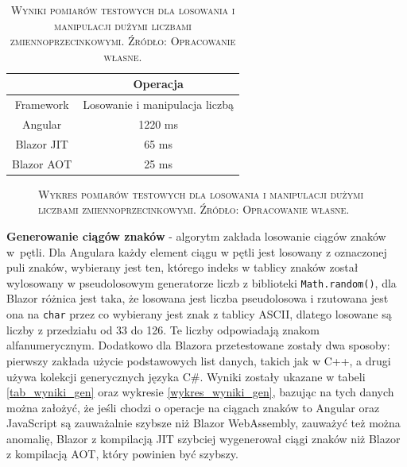 \documentclass[12pt,a4paper,oneside]{book}
\newcommand{\captionT}[1]{\caption{\textsc{\footnotesize{#1}}}}
\begin{document}
\begin{table}[!htp]
\centering
\begin{tabular}{ |c|c| }
 \hline
  & Operacja \\
 \hline
  Framework & Losowanie i manipulacja liczbą\\
 \hline
Angular & 1220 ms\\
Blazor JIT & 65 ms\\
Blazor AOT & 25 ms\\

 \hline
\end{tabular}
\captionT{Wyniki pomiarów testowych dla losowania i manipulacji dużymi liczbami zmiennoprzecinkowymi. Źródło: Opracowanie własne.}
\label{tab_wyniki_losowe_decimal}
\end{table}

\begin{figure}[!htp]
\centering
{}
\captionT{Wykres pomiarów testowych dla losowania i manipulacji dużymi liczbami zmiennoprzecinkowymi. Źródło: Opracowanie własne.}
\label{wykres_wyniki_losowe_decimal}
\end{figure}

\textbf{Generowanie ciągów znaków} - algorytm zakłada losowanie ciągów znaków w~pętli. Dla Angulara każdy element ciągu w pętli jest losowany z oznaczonej puli znaków, wybierany jest ten, którego indeks w tablicy znaków został wylosowany w pseudolosowym generatorze liczb z biblioteki \texttt{Math.random()}, dla Blazor różnica jest taka, że losowana jest liczba pseudolosowa i rzutowana jest ona na \texttt{char} przez co wybierany jest znak z tablicy ASCII, dlatego losowane są liczby z przedziału od 33 do 126. Te liczby odpowiadają znakom alfanumerycznym. Dodatkowo dla Blazora przetestowane zostały dwa sposoby: pierwszy zakłada użycie podstawowych list danych, takich jak w C++, a drugi używa kolekcji generycznych języka C\#. Wyniki zostały ukazane w tabeli \ref{tab_wyniki_gen} oraz wykresie \ref{wykres_wyniki_gen}, bazując na tych danych można założyć, że jeśli chodzi o operacje na ciągach znaków to Angular oraz JavaScript są zauważalnie szybsze niż Blazor WebAssembly, zauważyć też można anomalię, Blazor z kompilacją JIT szybciej wygenerował ciągi znaków niż Blazor z kompilacją AOT, który powinien być szybszy.
\end{document}
